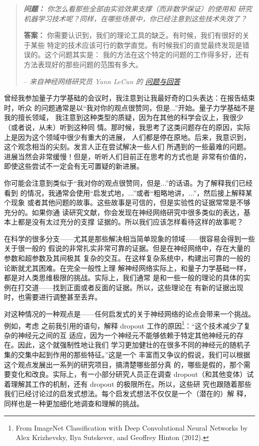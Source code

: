\begin{quote}
{\itshape \textbf{问题：} 你怎么看那些全部由实验效果支撑（而非数学保证）的使用和
  研究机器学习技术呢？同样，在哪些场景中，你已经注意到这些技术失效了？}

\textbf{答案：} 你需要认识到，我们的理论工具的缺乏。有时候，我们有很好的关于某些
特定的技术应该可行的数学直觉。有时候我们的直觉最终发现是错误的。这个问题其实是：
我的方法在这个特定的问题的工作得多好，还有方法表现好的那些问题的范围有多大。

-- {\itshape 来自神经网络研究员 Yann LeCun 的%
  \href{http://www.reddit.com/r/MachineLearning/comments/25lnbt/ama_yann_lecun/chivdv7}{
    问题与回答}}
\end{quote}

曾经我参加量子力学基础的会议时，我注意到让我最好奇的口头表达：在报告结束时，听众
的问题通常是以“我对你的观点很赞同，但是...”开始。量子力学基础不是我的擅长领域，
我注意到这种类型的质疑，因为在其他的科学会议上，我很少（或者说，从未）听到这种同
情。那时候，我思考了这类问题存在的原因，实际上是因为这个领域中很少有重大的进展，
人们都是停在原地。后来，我意识到，这个观念相当的尖刻。发言人正在尝试解决一些人们
所遇到的一些最难的问题。进展当然会非常缓慢！但是，听听人们目前正在思考的方式也是
非常有价值的，即使这些尝试不一定会有无可置疑的新进展。

你可能会注意到类似于“我对你的观点很赞同，但是...”的话语。为了解释我们已经看到
的情况，我通常会使用“启发式地，...”或者“粗略地讲，...”，然后接上解释某个现象
或者其他问题的故事。这些故事是可信的，但是实验性的证据常常是不够充分的。如果你通
读研究文献，你会发现在神经网络研究中很多类似的表达，基本上都是没有太过充分的支撑
证据的。所以我们应该怎样看待这样的故事呢？

在科学的很多分支——尤其是那些解决相当简单现象的领域——很容易会得到一些关于很一般的
假说的非常扎实非常可靠的证据。但是在神经网络中，存在大量的参数和超参数及其间极其
复杂的交互。在这样复杂系统中，构建出可靠的一般的论断就尤其困难。在完全一般性上理
解神经网络实际上，和量子力学基础一样，都是对人类思维极限的挑战。实际上，我们通常
是和一些一般的理论的具体的实例在打交道——找到正面或者反面的证据。所以，这些理论在
有新的证据出现时，也需要进行调整甚至丢弃。

对这种情况的一种观点是——任何启发式的关于神经网络的论点会带来一个挑战。例如，考虑
之前我引用的语句，解释 dropout 工作的原因\footnote{From ImageNet Classification with Deep Convolutional Neural Networks by Alex Krizhevsky, Ilya Sutskever, and Geoffrey Hinton (2012).}：“这个技术减少了复杂的神经元之间的互
适应，因为一个神经元不能够依赖于特定其他神经元的存在。因此，这个就强制性地让我们
学习更加健壮的在很多不同的神经元的随机子集的交集中起到作用的那些特征。”这是一个
丰富而又争议的假说，我们可以根据这个观点发展出一系列的研究项目，搞清楚哪些部分真
的，哪些是假的，那个需要变化和改良。实际上，有一小部分研究人员正在调查
dropout（和其他变体）试着理解其工作的机制，还有 dropout 的极限所在。所以，这些研
究也跟随着那些我们已经讨论过的启发式想法。每个启发式想法不仅仅是一个（潜在的）解
释，同样也是一种更加细化地调查和理解的挑战。

